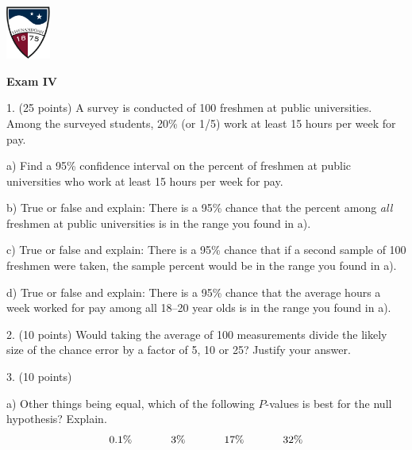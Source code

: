 \documentclass[10pt]{article}
\begin{document}
\pagestyle{empty}
\lstset{language=R, showspaces=false, showstringspaces=false}

\href{http://www.su.edu}{\includegraphics[height=1.75cm]{sulogo.eps}}
\vspace{-1.69cm}
\bigskip

\setlength{\baselineskip}{1.05\baselineskip}

\begin{center}
\textbf{\large  Exam IV}
\end{center}

1. (25 points) A survey is conducted of 100 freshmen at public universities.
Among the surveyed  students, 20\% (or 1/5) work at least 15 hours per week for pay.

\hspace{20pt} a) Find a 95\% confidence interval
on the  percent of freshmen at public universities who work at least 15 hours per week for pay.
\vspace{2.3in}

\hspace{20pt} b) True or false and explain:  There is a 95\% chance that the
percent among \textit{all} freshmen at public universities is in the range you found in a).
\vspace{1.5in}

\hspace{20pt} c) True or false and explain:  There is a 95\% chance that
if a second sample of 100 freshmen were taken,
the sample percent would be in the range you found in a).
\vspace{1.5in}

\hspace{20pt} d) True or false and explain:  There is a 95\% chance that the
average hours a week worked for pay among all 18--20 year olds
is in the range you found in a).
\vspace{1in}
\vfill
\eject
{\ }



2. (10 points)
Would taking the average of 100 measurements divide
the likely size of the chance error by a factor of 5, 10 or 25? Justify your answer.
\vspace{1.8in}

3. (10 points)

\hspace{10pt} a) Other things being equal, which of the following $P$-values is best for the null
hypothesis?  Explain.
\[0.1\% \hspace{.5in} 3\%\hspace{.5in} 17\%\hspace{.5in} 32\%\]
\vspace{.4in}
\end{document}
